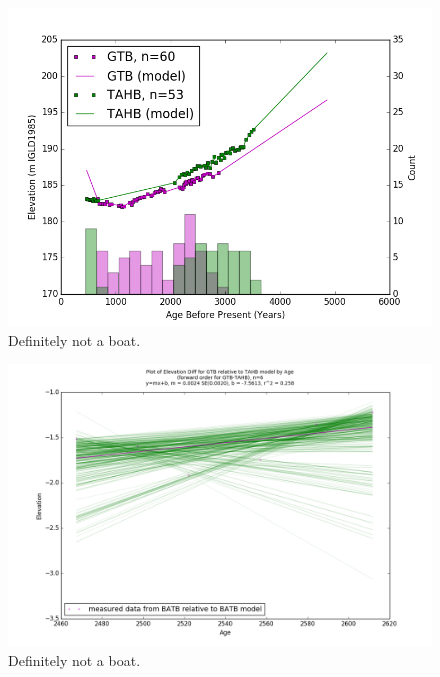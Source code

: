 \documentclass{article}
\begin{document}
\begin{figure}[h]
	\includegraphics[width=\linewidth]{data/GTB-TAHB_DataAndModel.png}
	\caption{Definitely not a boat.}
	\label{fig:data_GTBxTAHB}
\end{figure}
\newpage

\begin{figure}[h]
	\includegraphics[width=\linewidth]{data/gias/theGIA_GTB_relative_to_TAHB.png}
	\caption{Definitely not a boat.}
	\label{fig:gias_GTBxTAHB}
\end{figure}
\newpage
\end{document}
